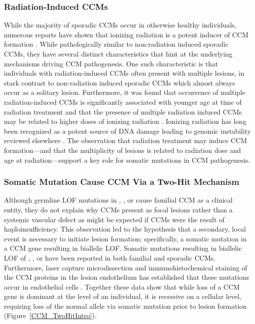 \subsubsection{Radiation-Induced CCMs}
While the majority of sporadic CCMs occur in otherwise healthy individuals, numerous reports have shown that ionizing radiation is a potent inducer of CCM formation \citep{cutsforthgregory2015, heckl2002, jain2005, burn2007, strenger2008, vinchon2011, koike2012, martinezlage2008, novelli1997, baumgartner2003}. While pathologically similar to non-radiation induced sporadic CCMs, they have several distinct characteristics that hint at the underlying mechanisms driving CCM pathogenesis. One such characteristic is that individuals with radiation-induced CCMs often present with multiple lesions, in stark contrast to non-radiation induced sporadic CCMs which almost always occur as a solitary lesion. Furthermore, it was found that occurrence of multiple radiation-induced CCMs is significantly associated with younger age at time of radiation treatment \citep{cutsforthgregory2015} and that the presence of multiple radiation induced CCMs may be related to higher doses of ionizing radiation \citep{novelli1997}. Ionizing radiation has long been recognized as a potent source of DNA damage leading to genomic instability reviewed elsewhere \citep{little1998}. The observation that radiation treatment may induce CCM formation---and that the multiplicity of lesions is related to radiation dose and age at radiation---support a key role for somatic mutations in CCM pathogenesis.

\subsubsection{Somatic Mutation Cause CCM Via a Two-Hit Mechanism}
Although germline LOF mutations in , , or  cause familial CCM as a clinical entity, they do not explain why CCMs present as focal lesions rather than a systemic vascular defect as might be expected if CCMs were the result of haploinsufficiency. This observation led to the hypothesis that a secondary, local event is necessary to initiate lesion formation; specifically, a somatic mutation in a CCM gene resulting in biallelic LOF. Somatic mutations resulting in biallelic LOF of , , or  have been reported in both familial \citep{gault2005, akers2009, gault2009} and sporadic \citep{mcdonald2014} CCMs. Furthermore, laser capture microdissection and immunohistochemical staining of the CCM proteins in the lesion endothelium has established that these mutations occur in endothelial cells \citep{akers2009, pagenstecher2009, rath2020}. Together these data show that while loss of a CCM gene is dominant at the level of an individual, it is recessive on a cellular level, requiring loss of the normal allele via somatic mutation prior to lesion formation (Figure~\ref{CCM_TwoHitIntro}).   

